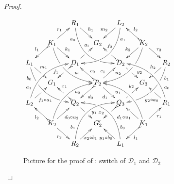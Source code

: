 \documentclass[a4paper,UKenglish,cleveref,pdftex,thm-restate,numberwithinsect,anonymous]{lipics}
\newcommand{\dder}[1]{\mathscr{#1}}
\begin{document}
\begin{proof}
	
	\begin{figure}[h]
		\centering 
		$\xymatrix@C=15pt@R=15pt{&&R_1 \ar@/_.8cm/[ddrr]_(.2){a_0}|(.7)\hole
			\ar[dr]^{h_1}&& L_2\ar@/^.8cm/[ddll]^(.2){a_1}
			\ar[dl]_{m_2}\\&K_1\ar[dr]^{k_1}\ar@{>->}[dl]_{l_1}
			\ar@/_.6cm/[ddrr]|(.36)\hole^(.65){u_1}\ar[ur]^{r_1}&& G_2 &&
			K_2
			\ar@/^.6cm/[ddll]|(.36)\hole_(.65){u_2}\ar[dl]_{k_2}\ar@{>->}[lu]_{l_2}
			\ar[dr]^{r_2}\\L_1
			\ar@/_.6cm/[ddrr]_(.2){b_0}|(.31)\hole|(.81)\hole
			\ar[dr]^(.4){m_1}|(.61)\hole && D_1
			\ar@{>->}[dl]|(.4)\hole_(.65){f_1}\ar[ur]|(.5)\hole^(.7){g_1}&&D_2
			\ar[dr]|(.4)\hole^(.65){g_2}
			\ar@{>->}[ul]|(.5)\hole_(.65){f_2}&&R_2\ar@/^.6cm/[ddll]^(.2){b_1}|(.31)\hole|(.81)\hole\ar[dl]_(.4){h_2}|(.61)\hole\\&G_1
			&&P_2\ar[dr]_{d_1}
			\ar@{>->}[dl]^{d_0}\ar[ur]^(.4){c_1}\ar@{>->}[ul]_(.4){c_0}&&G_3\\L_2
			\ar@/^.6cm/[uurr]^(.2){a_1} \ar[ur]_(.35){f_1\circ
				a_1}|(.61)\hole&&Q_2
			\ar@{>->}[ul]|(.4)\hole_(.65){x_1}\ar[dr]|(.5)\hole^(.65){y_1}
			&&Q_3\ar[ur]|(.4)\hole^(.65){y_2} \ar@{>->}[dl]|(.5)\hole_(.65){x_2}
			&& R_1 \ar[ul]^(.3){g_2\circ
				a_0}|(.61)\hole\ar@/_.6cm/[uull]_(.2){a_0}\\&K_2
			\ar[ur]_{d_0\circ u_2} \ar[dr]_{r_2}
			\ar@{>->}[ul]^{l_2}\ar@/^.6cm/[uurr]_(.65){u_2}&&G'_2&& K_1
			\ar[ur]_{r_1} \ar[ul]^{d_1\circ u_1} \ar@{>->}[dl]^{l_1}
			\ar@/_.6cm/[uull]^(.65){u_1}\\&& R_2
			\ar[ur]_{\hspace{-6pt}x_2\circ
				b_1}\ar@/^.8cm/[uurr]^(.2){b_1}&& L_1 \ar[ul]^{y_1\circ
				b_0\hspace{-7pt}} \ar@/_.8cm/[uull]_(.2){b_0} |(.69)\hole
		}	$		
		\caption{Picture for the proof of : switch of $\dder{D}_1$ and $\dder{D}_2$}
		\label{fi:second}
	\end{figure}
	

\end{proof}
\end{document}

